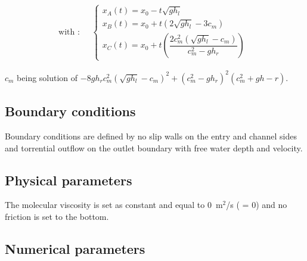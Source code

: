 \begin{equation}
\text{with :} \quad \begin{split}\begin{cases}
x_A(t) = x_0 - t \sqrt{g h_l} \\
x_B(t) = x_0 + t \left( 2 \sqrt{gh_l} - 3c_m \right) \\
x_C(t) = x_0 + t \left( \dfrac{2c_m^2 \left( \sqrt{gh_l} - c_m \right)}{c_m^2-g h_r} \right)
\end{cases}\end{split}
\end{equation}

$c_m$ being solution of $-8g h_r c_m^2 (\sqrt{gh_l}-c_m)^2+(c_m^2-gh_r)^2(c_m^2+gh-r)$.

\subsection{Boundary conditions}
Boundary conditions are defined by no slip walls on the entry and channel sides
and torrential outflow on the outlet boundary with free water depth and velocity.

\subsection{Physical parameters}

The molecular viscosity is set as constant and equal to 0~m$^2$/s
( = 0) and no friction is set to the bottom.

\subsection{Numerical parameters}

